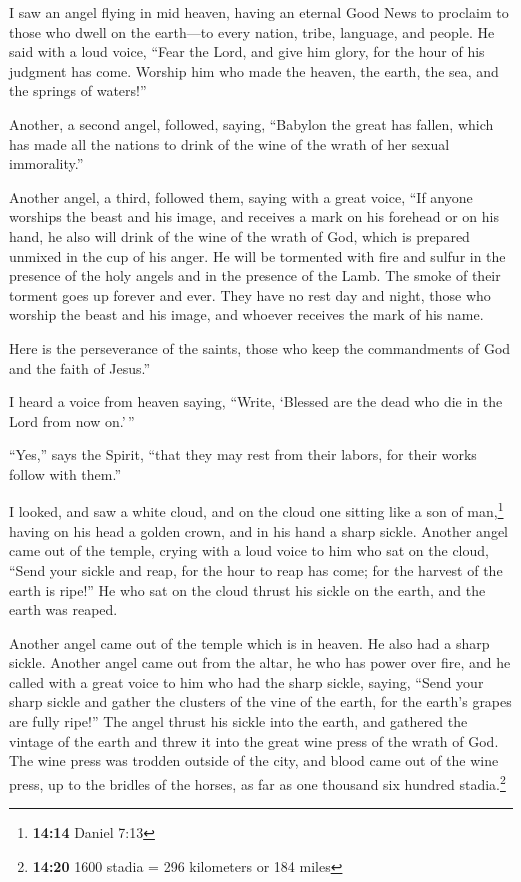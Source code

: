  I saw an angel flying in mid heaven, having an eternal
Good News to proclaim to those who dwell on the earth---to every nation,
tribe, language, and people.  He said with a loud voice,
``Fear the Lord, and give him glory, for the hour of his judgment has
come. Worship him who made the heaven, the earth, the sea, and the
springs of waters!''

 Another, a second angel, followed, saying, ``Babylon the
great has fallen, which has made all the nations to drink of the wine of
the wrath of her sexual immorality.''

 Another angel, a third, followed them, saying with a
great voice, ``If anyone worships the beast and his image, and receives
a mark on his forehead or on his hand,  he also will
drink of the wine of the wrath of God, which is prepared unmixed in the
cup of his anger. He will be tormented with fire and sulfur in the
presence of the holy angels and in the presence of the Lamb.
 The smoke of their torment goes up forever and ever.
They have no rest day and night, those who worship the beast and his
image, and whoever receives the mark of his name.

 Here is the perseverance of the saints, those who keep
the commandments of God and the faith of Jesus.''

 I heard a voice from heaven saying, ``Write, `Blessed
are the dead who die in the Lord from now on.'\,''

``Yes,'' says the Spirit, ``that they may rest from their labors, for
their works follow with them.''

 I looked, and saw a white cloud, and on the cloud one
sitting like a son of man,\footnote{\textbf{14:14} Daniel 7:13} having
on his head a golden crown, and in his hand a sharp sickle.
 Another angel came out of the temple, crying with a loud
voice to him who sat on the cloud, ``Send your sickle and reap, for the
hour to reap has come; for the harvest of the earth is ripe!''
 He who sat on the cloud thrust his sickle on the earth,
and the earth was reaped.

 Another angel came out of the temple which is in heaven.
He also had a sharp sickle.  Another angel came out from
the altar, he who has power over fire, and he called with a great voice
to him who had the sharp sickle, saying, ``Send your sharp sickle and
gather the clusters of the vine of the earth, for the earth's grapes are
fully ripe!''  The angel thrust his sickle into the
earth, and gathered the vintage of the earth and threw it into the great
wine press of the wrath of God.  The wine press was
trodden outside of the city, and blood came out of the wine press, up to
the bridles of the horses, as far as one thousand six hundred
stadia.\footnote{\textbf{14:20} 1600 stadia = 296 kilometers or 184
  miles}

